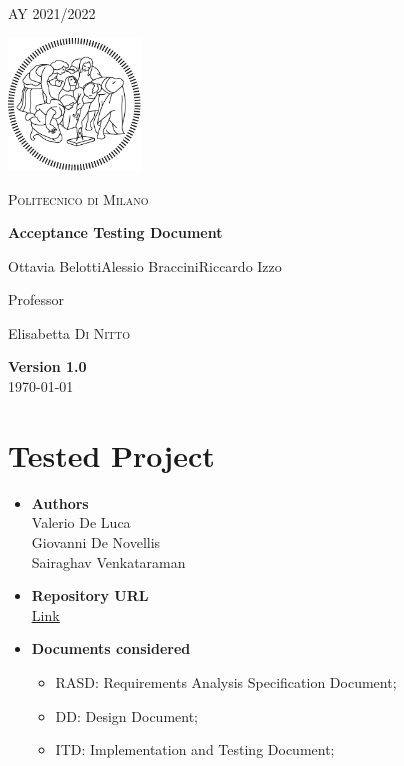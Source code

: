 \documentclass[table, 12pt]{article}
\begin{document}
\begin{titlepage}
    \centering
    {\scshape\large AY 2021/2022 \par}
    \vfill
    \includegraphics[width=100pt]{assets/logo-polimi-new}\par\vspace{1cm}
    {\scshape\LARGE Politecnico di Milano \par}
    \vspace{1.5cm}
    {\huge\bfseries Acceptance Testing Document \par}
    \vspace{2cm}
    {\Large {Ottavia Belotti\quad Alessio Braccini\quad Riccardo Izzo}\par}
    \vfill
    {\large Professor\par
        Elisabetta \textsc{Di Nitto}}
    \vfill
    {\large \textbf{Version 1.0} \\ \today \par}
\end{titlepage}
\thispagestyle{plain}
\mbox{}
\newpage
{}
\tableofcontents
\newpage
{}

\section{Tested Project}
\begin{itemize}
    \item \textbf{Authors}\\Valerio De Luca\\Giovanni De Novellis\\Sairaghav Venkataraman
    \item \textbf{Repository URL}\\ \underline{\href{https://github.com/sairaghav/DeLucaDeNovellisVenkataraman}{Link}}
    \item \textbf{Documents considered}\begin{itemize}
              \item RASD: Requirements Analysis Specification Document;
              \item DD: Design Document;
              \item ITD: Implementation and Testing Document;
          \end{itemize}
\end{itemize}
\newpage
\end{document}
